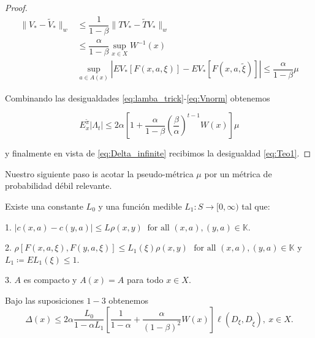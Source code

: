 \documentclass[11pt, spanish]{amsart}
\begin{document}
\begin{proof}
\begin{align}
\|V_{*}-\widetilde{V}_{*}\|_{w} & \leq\dfrac{1}{1-\beta}\|TV_{*}-\widetilde{T}V_{*}\|_{w}\nonumber \\
 & \leq\dfrac{\alpha}{1-\beta}\sup_{x\in X}W^{-1}\left(x\right)\label{eq:Vnorm}\\
 & \sup_{a\in A\left(x\right)}\left|EV_{*}\left[F\left(x,a,\xi\right)\right]-EV_{*}\left[F\left(x,a,\widetilde{\xi}\right)\right]\right|\leq\dfrac{\alpha}{1-\beta}\mu\nonumber 
\end{align}

Combinando las desigualdades \ref{eq:lamba_trick}-\ref{eq:Vnorm}
obtenemos 

\[
E_{x}^{\widetilde{\pi}}\left|\Lambda_{t}\right|\leq2\alpha\left[1+\dfrac{\alpha}{1-\beta}\left(\dfrac{\beta}{\alpha}\right)^{t-1}W\left(x\right)\right]\mu
\]

y finalmente en vista de \ref{eq:Delta_infinite} recibimos la desigualdad
\ref{eq:Teo1}.
\end{proof}
%
Nuestro siguiente paso is acotar la pseudo-métrica $\mu$ por un métrica
de probabilidad débil relevante.
\begin{assumption}
\label{assu:Sup3}Existe una constante $L_{0}$ y una función medible
$L_{1}:S\to[0,\infty)$ tal que:

1. $\left|c\left(x,a\right)-c\left(y,a\right)\right|\leq L\rho\left(x,y\right)\ \text{ for all }\left(x,a\right),\left(y,a\right)\in\mathbb{K}$.

2. $\rho\left[F\left(x,a,\xi\right),F\left(y,a,\xi\right)\right]\leq L_{1}\left(\xi\right)\rho\left(x,y\right)\text{ }\text{for all }\left(x,a\right),\left(y,a\right)\in\mathbb{K}$
y $L_{1}\coloneqq EL_{1}\left(\xi\right)\leq1$.

$3.$ $A$ es compacto y $A\left(x\right)=A$ para todo $x\in X$. 
\end{assumption}
\begin{thm}
\label{thm:Teo2} Bajo las suposiciones $1-3$ obtenemos 
\begin{equation}
\Delta\left(x\right)\leq2\alpha\dfrac{L_{0}}{1-\alpha L_{1}}\left[\dfrac{1}{1-\alpha}+\dfrac{\alpha}{\left(1-\beta\right)^{2}}W\left(x\right)\right]\ell\left(D_{\xi},D_{\widetilde{\xi}}\right),\ x\in X.\label{eq:Teo2}
\end{equation}
\end{thm}
%
\end{document}
